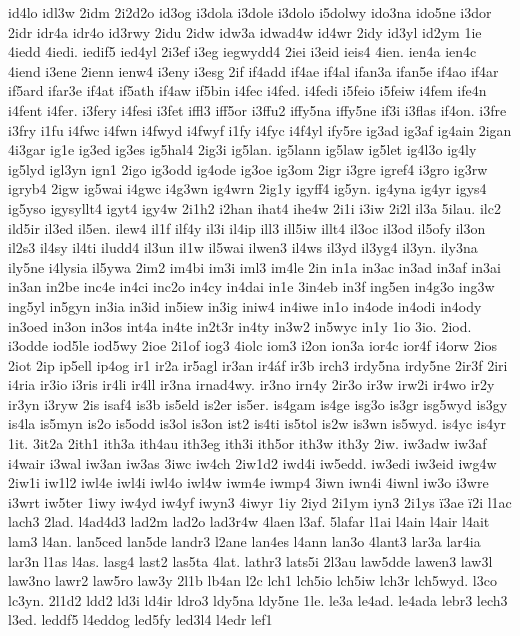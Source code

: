 {id4lo
idl3w
2idm
2i2d2o
id3og
i3dola
i3dole
i3dolo
i5dolwy
ido3na
ido5ne
i3dor
2idr
idr4a
idr4o
id3rwy
2idu
2idw
idw3a
idwad4w
id4wr
2idy
id3yl
id2ym
1ie
4iedd
4iedi.
iedif5
ied4yl
2i3ef
i3eg
iegwydd4
2iei
i3eid
ieis4
4ien.
ien4a
ien4c
4iend
i3ene
2ienn
ienw4
i3eny
i3esg
2if
if4add
if4ae
if4al
ifan3a
ifan5e
if4ao
if4ar
if5ard
ifar3e
if4at
if5ath
if4aw
if5bin
i4fec
i4fed.
i4fedi
i5feio
i5feiw
i4fem
ife4n
i4fent
i4fer.
i3fery
i4fesi
i3fet
iffl3
iff5or
i3ffu2
iffy5na
iffy5ne
if3i
i3flas
if4on.
i3fre
i3fry
i1fu
i4fwc
i4fwn
i4fwyd
i4fwyf
i1fy
i4fyc
i4f4yl
ify5re
ig3ad
ig3af
ig4ain
2igan
4i3gar
ig1e
ig3ed
ig3es
ig5hal4
2ig3i
ig5lan.
ig5lann
ig5law
ig5let
ig4l3o
ig4ly
ig5lyd
igl3yn
ign1
2igo
ig3odd
ig4ode
ig3oe
ig3om
2igr
i3gre
igref4
i3gro
ig3rw
igryb4
2igw
ig5wai
i4gwc
i4g3wn
ig4wrn
2ig1y
igyff4
ig5yn.
ig4yna
ig4yr
igys4
ig5yso
igysyllt4
igyt4
igy4w
2i1h2
i2han
ihat4
ihe4w
2i1i
i3iw
2i2l
il3a
5ilau.
ilc2
ild5ir
il3ed
il5en.
ilew4
il1f
ilf4y
il3i
il4ip
ill3
ill5iw
illt4
il3oc
il3od
il5ofy
il3on
il2s3
il4sy
il4ti
iludd4
il3un
il1w
il5wai
ilwen3
il4ws
il3yd
il3yg4
il3yn.
ily3na
ily5ne
i4lysia
il5ywa
2im2
im4bi
im3i
iml3
im4le
2in
in1a
in3ac
in3ad
in3af
in3ai
in3an
in2be
inc4e
in4ci
inc2o
in4cy
in4dai
in1e
3in4eb
in3f
ing5en
in4g3o
ing3w
ing5yl
in5gyn
in3ia
in3id
in5iew
in3ig
iniw4
in4iwe
in1o
in4ode
in4odi
in4ody
in3oed
in3on
in3os
int4a
in4te
in2t3r
in4ty
in3w2
in5wyc
in1y
1io
3io.
2iod.
i3odde
iod5le
iod5wy
2ioe
2i1of
iog3
4iolc
iom3
i2on
ion3a
ior4c
ior4f
i4orw
2ios
2iot
2ip
ip5ell
ip4og
ir1
ir2a
ir5agl
ir3an
ir4áf
ir3b
irch3
irdy5na
irdy5ne
2ir3f
2iri
i4ria
ir3io
i3ris
ir4li
ir4ll
ir3na
irnad4wy.
ir3no
irn4y
2ir3o
ir3w
irw2i
ir4wo
ir2y
ir3yn
i3ryw
2is
isaf4
is3b
is5eld
is2er
is5er.
is4gam
is4ge
isg3o
is3gr
isg5wyd
is3gy
is4la
is5myn
is2o
is5odd
is3ol
is3on
ist2
is4ti
is5tol
is2w
is3wn
is5wyd.
is4yc
is4yr
1it.
3it2a
2ith1
ith3a
ith4au
ith3eg
ith3i
ith5or
ith3w
ith3y
2iw.
iw3adw
iw3af
i4wair
i3wal
iw3an
iw3as
3iwc
iw4ch
2iw1d2
iwd4i
iw5edd.
iw3edi
iw3eid
iwg4w
2iw1i
iw1l2
iwl4e
iwl4i
iwl4o
iwl4w
iwm4e
iwmp4
3iwn
iwn4i
4iwnl
iw3o
i3wre
i3wrt
iw5ter
1iwy
iw4yd
iw4yf
iwyn3
4iwyr
1iy
2iyd
2i1ym
iyn3
2i1ys
ï3ae
ï2i
l1ac
lach3
2lad.
l4ad4d3
lad2m
lad2o
lad3r4w
4laen
l3af.
5lafar
l1ai
l4ain
l4air
l4ait
lam3
l4an.
lan5ced
lan5de
landr3
l2ane
lan4es
l4ann
lan3o
4lant3
lar3a
lar4ia
lar3n
l1as
l4as.
lasg4
last2
las5ta
4lat.
lathr3
lats5i
2l3au
law5dde
lawen3
law3l
law3no
lawr2
law5ro
law3y
2l1b
lb4an
l2c
lch1
lch5io
lch5iw
lch3r
lch5wyd.
l3co
lc3yn.
2l1d2
ldd2
ld3i
ld4ir
ldro3
ldy5na
ldy5ne
1le.
le3a
le4ad.
le4ada
lebr3
lech3
l3ed.
leddf5
l4eddog
led5fy
led3l4
l4edr
lef1
}
